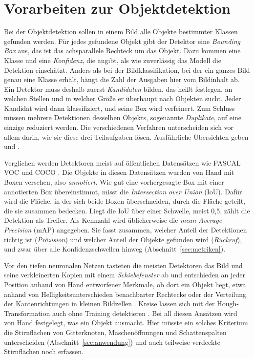 \section{Vorarbeiten zur Objektdetektion}
\label{sec:vorarbeiten}

Bei der Objektdetektion sollen in einem Bild alle Objekte bestimmter Klassen
gefunden werden. Für jedes gefundene Objekt gibt der Detektor eine
\emph{Bounding Box} aus, das ist das achsparallele Rechteck um das Objekt.
Dazu kommen eine Klasse und eine \emph{Konfidenz}, die angibt, als wie
zuverlässig das Modell die Detektion einschätzt. Anders als bei der
Bildklassifikation, bei der ein ganzes Bild genau eine Klasse erhält, hängt die
Zahl der Ausgaben hier vom Bildinhalt ab. Ein Detektor muss deshalb zuerst
\emph{Kandidaten} bilden, das heißt festlegen, an welchen Stellen und in welcher
Größe er überhaupt nach Objekten sucht. Jeder Kandidat wird dann klassifiziert,
und seine Box wird verfeinert. Zum Schluss müssen mehrere Detektionen desselben
Objekts, sogenannte \emph{Duplikate}, auf eine einzige reduziert werden. Die
verschiedenen Verfahren unterscheiden sich vor allem darin, wie sie diese drei
Teilaufgaben lösen. Ausführliche Übersichten geben \textcite{liu2020survey} und
\textcite{zou2023survey}.

Verglichen werden Detektoren meist auf öffentlichen Datensätzen wie PASCAL VOC
\parencite{everingham2010} und COCO \parencite{lin2014coco}. Die Objekte in
diesen Datensätzen wurden von Hand mit Boxen versehen, also \emph{annotiert}.
Wie gut eine vorhergesagte Box mit einer annotierten Box übereinstimmt, misst
die \emph{Intersection over Union} (IoU). Dafür wird die Fläche, in der sich
beide Boxen überschneiden, durch die Fläche geteilt, die sie zusammen bedecken.
Liegt die IoU über einer Schwelle, meist 0,5, zählt die Detektion als Treffer.
Als Kennzahl wird üblicherweise die \emph{mean Average Precision} (mAP)
angegeben. Sie fasst zusammen, welcher Anteil der Detektionen richtig ist
(\emph{Präzision}) und welcher Anteil der Objekte gefunden wird
(\emph{Rückruf}), und zwar über alle Konfidenzschwellen hinweg
(Abschnitt~\ref{sec:metriken}).

 Vor den tiefen neuronalen Netzen tasteten die
meisten Detektoren das Bild und seine verkleinerten Kopien mit einem
\emph{Schiebefenster} ab und entschieden an jeder Position anhand von Hand
entworfener Merkmale, ob dort ein Objekt liegt, etwa anhand von
Helligkeitsunterschieden benachbarter Rechtecke \parencite{viola2001} oder der
Verteilung der Kantenrichtungen in kleinen Bildzellen \parencite{dalal2005}.
Kreise lassen sich mit der Hough-Transformation auch ohne Training detektieren
\parencite{duda1972}. Bei all diesen Ansätzen wird von Hand festgelegt, was ein
Objekt ausmacht. Hier müsste ein solches Kriterium die Stirnflächen von
Gitterknoten, Maschenöffnungen und Schattenspalten unterscheiden
(Abschnitt~\ref{sec:anwendung}) und auch teilweise verdeckte Stirnflächen noch
erfassen.

